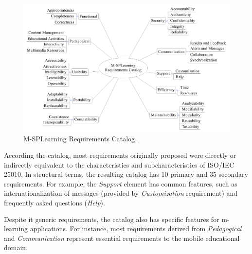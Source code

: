\begin{figure}
    \centering
    \includegraphics[scale=0.37]{figures/section3/MSPLCatalog}
    \caption{M-SPLearning Requirements Catalog \cite{falvojr14b}.}
    \label{figureMSPLCatalog}
\end{figure}

According the catalog, most requirements originally proposed were directly or indirectly equivalent to the characteristics and subcharacteristics of ISO/IEC 25010. %
In structural terms, the resulting catalog has 10 primary and 35 secondary requirements. For example, the \textit{Support} element has common features, such as internationalization of messages (provided by \textit{Customization} requirement) and frequently asked questions (\textit{Help}).

Despite it generic requirements, the catalog also has specific features for m-learning applications. For instance, most requirements derived from \textit{Pedagogical} and \textit{Communication} represent essential requirements to the mobile educational domain.

